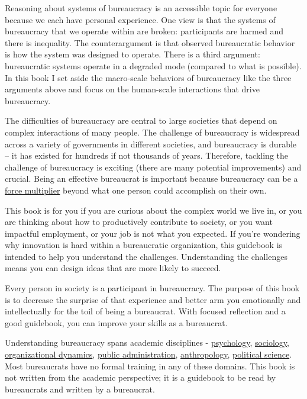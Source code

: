 Reasoning about systems of bureaucracy is an accessible topic for everyone because we each have personal experience.
One view is that the systems of bureaucracy that we operate within are broken: participants are harmed and there is inequality. 
The counterargument is that observed bureaucratic behavior is how the system was designed to operate. There is a third argument: bureaucratic systems operate in a degraded mode (compared to what is possible). 
In this book I set aside the macro-scale behaviors of bureaucracy like the three arguments above and focus on the human-scale interactions that drive bureaucracy.

The difficulties of bureaucracy are central  to large societies that depend on complex interactions of many people. The challenge of bureaucracy is widespread across a variety of governments in different societies, and bureaucracy is durable -- it has existed for hundreds if not thousands of years. Therefore, tackling the challenge of bureaucracy is exciting (there are many potential improvements) and crucial. 
Being an effective bureaucrat is important because bureaucracy can be a \href{https://en.wikipedia.org/wiki/Force_multiplication}{force multiplier} beyond what one person could accomplish on their own.


This book is for you if you are curious about the complex world we live in, or you are thinking about how to productively contribute to society, or you want impactful employment, or your job is not what you expected. If you're wondering why innovation is hard within a bureaucratic organization, this guidebook is intended to help you understand the challenges. Understanding the challenges means you can design ideas that are more likely to succeed.


Every person in society is a participant in bureaucracy. The purpose of this book is to decrease the surprise of that experience and better arm you emotionally and intellectually for the toil of being a bureaucrat. With focused reflection and a good guidebook, you can improve your skills as a bureaucrat. 

Understanding bureaucracy spans academic disciplines - \href{https://en.wikipedia.org/wiki/Psychology}{psychology}, \href{https://en.wikipedia.org/wiki/Sociology}{sociology}, \href{https://en.wikipedia.org/wiki/Organizational_behavior}{organizational dynamics}, \href{https://en.wikipedia.org/wiki/Public_administration}{public administration}, \href{https://en.wikipedia.org/wiki/Anthropology}{anthropology}, \href{https://en.wikipedia.org/wiki/Political_science}{political science}. Most bureaucrats have no formal training in any of these domains. This book is not written from the academic perspective; it is a guidebook to be read by bureaucrats and written by a bureaucrat. 

